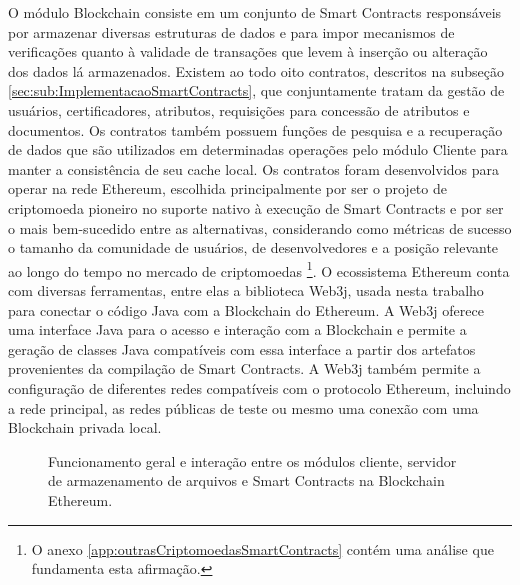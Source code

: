 \documentclass[a4paper,11pt]{article}
\begin{document}
O módulo Blockchain consiste em um conjunto de Smart Contracts responsáveis por armazenar diversas estruturas de dados e para impor mecanismos de verificações quanto à validade de transações que levem à inserção ou alteração dos dados lá armazenados.
Existem ao todo oito contratos, descritos na subseção \ref{sec:sub:ImplementacaoSmartContracts}, que conjuntamente tratam da gestão de usuários, certificadores, atributos, requisições para concessão de atributos e documentos.
Os contratos também possuem funções de pesquisa e a recuperação de dados que são utilizados em determinadas operações pelo módulo Cliente para manter a consistência de seu cache local.
Os contratos foram desenvolvidos para operar na rede Ethereum, escolhida principalmente por ser o projeto de criptomoeda pioneiro no suporte nativo à execução de Smart Contracts e por ser o mais bem-sucedido entre as alternativas, considerando como métricas de sucesso o tamanho da comunidade de usuários, de desenvolvedores e a posição relevante ao longo do tempo no mercado de criptomoedas
\footnote{O anexo \ref{app:outrasCriptomoedasSmartContracts} contém uma análise que fundamenta esta afirmação.}.
O ecossistema Ethereum conta com diversas ferramentas, entre elas a biblioteca Web3j, usada nesta trabalho para conectar o código Java com a Blockchain do Ethereum.
A Web3j oferece uma interface Java para o acesso e interação com a Blockchain e permite a geração de classes Java compatíveis com essa interface a partir dos artefatos provenientes da compilação de Smart Contracts.
A Web3j também permite a configuração de diferentes redes compatíveis com o protocolo Ethereum, incluindo a rede principal, as redes públicas de teste ou mesmo uma conexão com uma Blockchain privada local.


\begin{figure}[H]
  \centering
  
  \caption{Funcionamento geral e interação entre os módulos cliente, servidor de armazenamento de arquivos e Smart Contracts na Blockchain Ethereum.}
  \label{fig:diagramaSmartDCPABE}
\end{figure}

\end{document}
